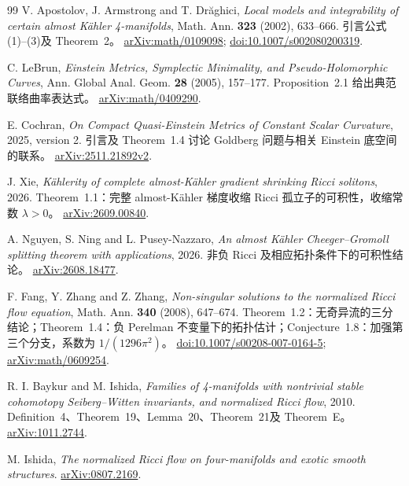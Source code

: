 \documentclass[11pt,a4paper]{article}
\newcommand{\Ka}{K{\latin\"a}hler}
\theoremstyle{definition}
\numberwithin{equation}{section}
\begin{document}
\begin{thebibliography}{99}
V. Apostolov, J. Armstrong and T. Dr{\latin\u a}ghici,
\emph{Local models and integrability of certain almost K{\latin\"a}hler 4-manifolds}, Math. Ann. \textbf{323} (2002), 633--666.
引言公式(1)--(3)及 Theorem~2。
\href{https://arxiv.org/abs/math/0109098}{arXiv:math/0109098};
\href{https://doi.org/10.1007/s002080200319}{doi:10.1007/s002080200319}.

C. LeBrun, \emph{Einstein Metrics, Symplectic Minimality, and Pseudo-Holomorphic Curves}, Ann. Global Anal. Geom. \textbf{28} (2005), 157--177.
Proposition~2.1 给出典范联络曲率表达式。
\href{https://arxiv.org/abs/math/0409290}{arXiv:math/0409290}.

E. Cochran, \emph{On Compact Quasi-Einstein Metrics of Constant Scalar Curvature}, 2025, version 2.
引言及 Theorem~1.4 讨论 Goldberg 问题与相关 Einstein 底空间的联系。
\href{https://arxiv.org/abs/2511.21892}{arXiv:2511.21892v2}.

J. Xie, \emph{K{\latin\"a}hlerity of complete almost-K{\latin\"a}hler gradient shrinking Ricci solitons}, 2026.
Theorem~1.1：完整 almost-\Ka{} 梯度收缩 Ricci 孤立子的可积性，收缩常数 $\lambda>0$。
\href{https://arxiv.org/abs/2609.00840}{arXiv:2609.00840}.

A. Nguyen, S. Ning and L. Pusey-Nazzaro,
\emph{An almost K{\latin\"a}hler Cheeger--Gromoll splitting theorem with applications}, 2026.
非负 Ricci 及相应拓扑条件下的可积性结论。
\href{https://arxiv.org/abs/2608.18477}{arXiv:2608.18477}.

F. Fang, Y. Zhang and Z. Zhang, \emph{Non-singular solutions to the normalized Ricci flow equation}, Math. Ann. \textbf{340} (2008), 647--674.
Theorem~1.2：无奇异流的三分结论；Theorem~1.4：负 Perelman 不变量下的拓扑估计；Conjecture~1.8：加强第三个分支，系数为 $1/(1296\pi^2)$。
\href{https://doi.org/10.1007/s00208-007-0164-5}{doi:10.1007/s00208-007-0164-5};
\href{https://arxiv.org/abs/math/0609254}{arXiv:math/0609254}.

R. I. Baykur and M. Ishida,
\emph{Families of 4-manifolds with nontrivial stable cohomotopy Seiberg--Witten invariants, and normalized Ricci flow}, 2010.
Definition~4、Theorem~19、Lemma~20、Theorem~21及 Theorem~E。
\href{https://arxiv.org/abs/1011.2744}{arXiv:1011.2744}.

M. Ishida, \emph{The normalized Ricci flow on four-manifolds and exotic smooth structures}.
\href{https://arxiv.org/abs/0807.2169}{arXiv:0807.2169}.


\end{thebibliography}
\end{document}
